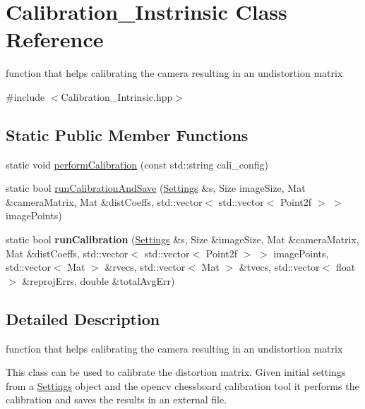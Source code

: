 \hypertarget{class_calibration___instrinsic}{}\section{Calibration\+\_\+\+Instrinsic Class Reference}
\label{class_calibration___instrinsic}


function that helps calibrating the camera resulting in an undistortion matrix  




{\ttfamily \#include $<$Calibration\+\_\+\+Intrinsic.\+hpp$>$}

\subsection*{Static Public Member Functions}
\begin{DoxyCompactItemize}
\item 
static void \mbox{\hyperlink{class_calibration___instrinsic_a65d585bbfe48d2c1cedbc0f1b43b05d5}{perform\+Calibration}} (const std\+::string cali\+\_\+config)
\item 
static bool \mbox{\hyperlink{class_calibration___instrinsic_aa8de03a03a709d52c9ac4e076e99072e}{run\+Calibration\+And\+Save}} (\mbox{\hyperlink{class_settings}{Settings}} \&s, Size image\+Size, Mat \&camera\+Matrix, Mat \&dist\+Coeffs, std\+::vector$<$ std\+::vector$<$ Point2f $>$ $>$ image\+Points)
\item 
\mbox{\label{class_calibration___instrinsic_aec65e62022a78dd3c200ab613d4e1256}} 
static bool {\bfseries run\+Calibration} (\mbox{\hyperlink{class_settings}{Settings}} \&s, Size \&image\+Size, Mat \&camera\+Matrix, Mat \&dist\+Coeffs, std\+::vector$<$ std\+::vector$<$ Point2f $>$ $>$ image\+Points, std\+::vector$<$ Mat $>$ \&rvecs, std\+::vector$<$ Mat $>$ \&tvecs, std\+::vector$<$ float $>$ \&reproj\+Errs, double \&total\+Avg\+Err)
\end{DoxyCompactItemize}


\subsection{Detailed Description}
function that helps calibrating the camera resulting in an undistortion matrix 

This class can be used to calibrate the distortion matrix. Given initial settings from a \mbox{\hyperlink{class_settings}{Settings}} object and the opencv chessboard calibration tool it performs the calibration and saves the results in an external file.

